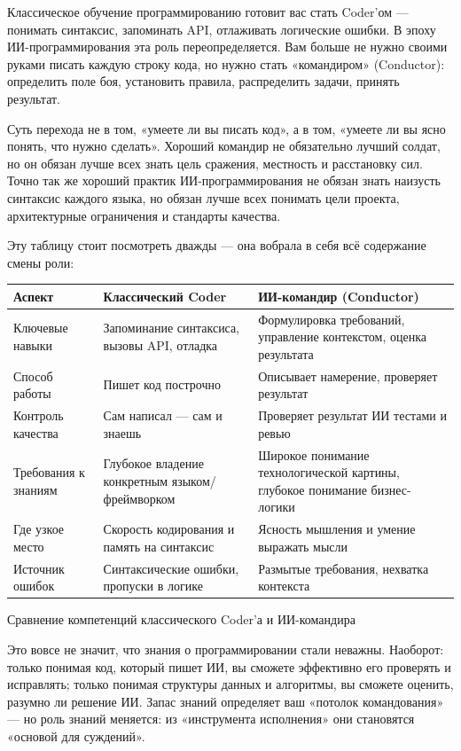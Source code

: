 
Классическое обучение программированию готовит вас стать Coder'ом — понимать синтаксис, запоминать API, отлаживать логические ошибки. В эпоху ИИ-программирования эта роль переопределяется. Вам больше не нужно своими руками писать каждую строку кода, но нужно стать «командиром» (Conductor): определить поле боя, установить правила, распределить задачи, принять результат.

Суть перехода не в том, «умеете ли вы писать код», а в том, «умеете ли вы ясно понять, что нужно сделать». Хороший командир не обязательно лучший солдат, но он обязан лучше всех знать цель сражения, местность и расстановку сил. Точно так же хороший практик ИИ-программирования не обязан знать наизусть синтаксис каждого языка, но обязан лучше всех понимать цели проекта, архитектурные ограничения и стандарты качества.

Эту таблицу стоит посмотреть дважды — она вобрала в себя всё содержание смены роли:

\begin{center}
\begin{tabularx}{\linewidth}{|X|X|X|}
\hline
\textbf{Аспект} & \textbf{Классический Coder} & \textbf{ИИ-командир (Conductor)} \tabularnewline
\hline
Ключевые навыки & Запоминание синтаксиса, вызовы API, отладка & Формулировка требований, управление контекстом, оценка результата \tabularnewline
Способ работы & Пишет код построчно & Описывает намерение, проверяет результат \tabularnewline
Контроль качества & Сам написал — сам и знаешь & Проверяет результат ИИ тестами и ревью \tabularnewline
Требования к знаниям & Глубокое владение конкретным языком/фреймворком & Широкое понимание технологической картины, глубокое понимание бизнес-логики \tabularnewline
Где узкое место & Скорость кодирования и память на синтаксис & Ясность мышления и умение выражать мысли \tabularnewline
Источник ошибок & Синтаксические ошибки, пропуски в логике & Размытые требования, нехватка контекста \tabularnewline
\hline
\end{tabularx}
\end{center}

\begin{center}\small\color{gray}Сравнение компетенций классического Coder'а и ИИ-командира\end{center}

Это вовсе не значит, что знания о программировании стали неважны. Наоборот: только понимая код, который пишет ИИ, вы сможете эффективно его проверять и исправлять; только понимая структуры данных и алгоритмы, вы сможете оценить, разумно ли решение ИИ. Запас знаний определяет ваш «потолок командования» — но роль знаний меняется: из «инструмента исполнения» они становятся «основой для суждений».

